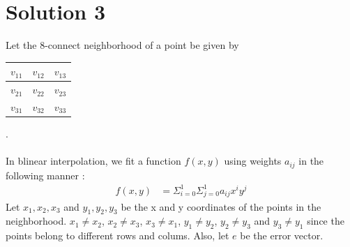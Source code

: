 \documentclass[a4paper,fleqn,11pt]{article}
\theoremstyle{mytheor}
\begin{document}
\section*{Solution 3}
Let the 8-connect neighborhood of a point be given by
\begin{tabular}{| c | c | c |}
	\hline
	$v_{11}$	& $v_{12}$ 	& $v_{13}$ \\
	\hline
	$v_{21}$	& $v_{22}$ 	& $v_{23}$\\
	\hline
	$v_{31}$ 	& $v_{32}$  & $v_{33}$ \\
	\hline
\end{tabular}. \\ \\
In blinear interpolation, we fit a function $f(x, y)$ using weights $a_{ij}$ in the following manner :
\begin{align}
f(x, y) & = \Sigma_{i = 0}^1\Sigma_{j = 0}^1 a_{ij}x^i y^j
\end{align}
Let $x_1, x_2, x_3$ and $y_1, y_2, y_3$ be the x and y coordinates of the points in the neighborhood. $x_1 \neq x_2$, $x_2 \neq x_3$, $x_3 \neq x_1$, $y_1 \neq y_2$, $y_2 \neq y_3$ and $y_3 \neq y_1$ since the points belong to different rows and colums. Also, let $e$ be the error vector.
\end{document}
